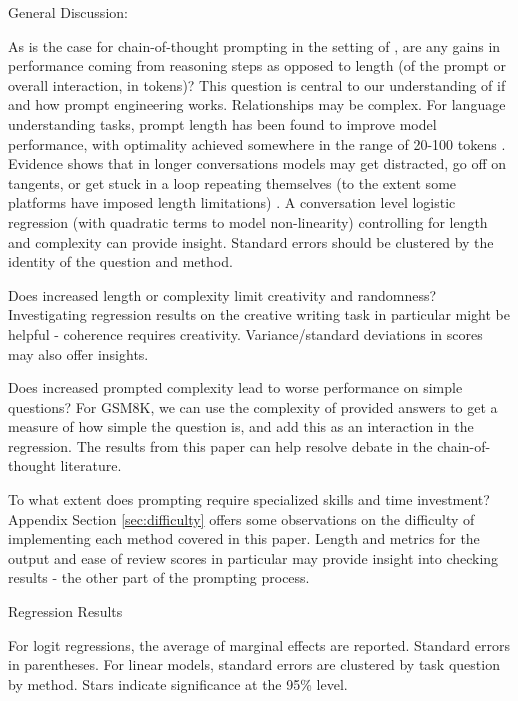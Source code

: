 \documentclass[11pt]{article}
\begin{document}
\clearpage

\twocolumn

General Discussion:

As is the case for chain-of-thought prompting in the setting of \citealp{fu_complexity-based_2023}, are any gains in performance coming from reasoning steps as opposed to length (of the prompt or overall interaction, in tokens)? This question is central to our understanding of if and how prompt engineering works. Relationships may be complex. For language understanding tasks, prompt length has been found to improve model performance, with optimality achieved somewhere in the range of 20-100 tokens \cite{lester_power_2021}. Evidence shows that in longer conversations models may get distracted, go off on tangents, or get stuck in a loop repeating themselves (to the extent some platforms have imposed length limitations) \cite{shi_large_2023, mann_microsoft_nodate}. A conversation level logistic regression (with quadratic terms to model non-linearity) controlling for length and complexity can provide insight. Standard errors should be clustered by the identity of the question and method.

Does increased length or complexity limit creativity and randomness? Investigating regression results on the creative writing task in particular might be helpful - coherence requires creativity. Variance/standard deviations in scores may also offer insights.

Does increased prompted complexity lead to worse performance on simple questions? For GSM8K, we can use the complexity of provided answers to get a measure of how simple the question is, and add this as an interaction in the regression. The results from this paper can help resolve debate in the chain-of-thought literature. \cite{fu_complexity-based_2023, shum_automatic_2023}

To what extent does prompting require specialized skills and time investment? Appendix Section \ref{sec:difficulty} offers some observations on the difficulty of implementing each method covered in this paper. Length and metrics for the output and ease of review scores in particular may provide insight into checking results - the other part of the prompting process.

\onecolumn

\begin{table}
  \caption{Regression Results}
  \centering
  \tiny
    
  \label{tab:regressions}
  \newline \newline \footnotesize For logit regressions, the average of marginal effects are reported. Standard errors in parentheses. For linear models, standard errors are clustered by task question by method. Stars indicate significance at the 95\% level.
\end{table}
\end{document}
